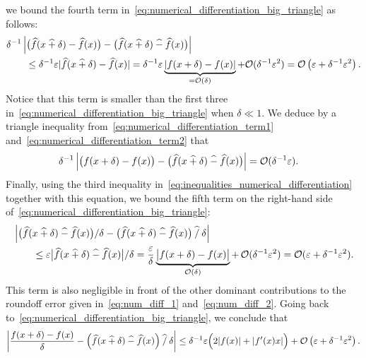 \begin{solution}
    we bound the fourth term in~\eqref{eq:numerical_differentiation_big_triangle} as follows:
    \begin{align}
        \nonumber
        &\delta^{-1} \left\lvert \bigl( \widehat f(x \mathbin{\widehat +} \delta) - \widehat f(x) \bigr)  - \bigl( \widehat f(x \mathbin{\widehat +} \delta) \mathbin{\widehat -} \widehat f(x) \bigr)  \right\rvert \\
        \label{eq:numerical_differentiation_term2}
        &\qquad \leq \delta^{-1} \varepsilon \lvert\widehat f(x \mathbin{\widehat +} \delta) - \widehat f(x)\rvert
        = \delta^{-1} \varepsilon  \underbrace{\lvert f(x + \delta) - f(x)\rvert}_{= \mathcal O(\delta)} +  \mathcal O (\delta^{-1} \varepsilon^2)
        = \mathcal O\left(\varepsilon + \delta^{-1} \varepsilon^2\right).
    \end{align}
    Notice that this term is smaller than the first three in~\eqref{eq:numerical_differentiation_big_triangle} when $\delta \ll 1$.
    We deduce by a triangle inequality from~\eqref{eq:numerical_differentiation_term1} and~\eqref{eq:numerical_differentiation_term2} that
    \begin{align*}
        \label{eq:intermedia_numerical_derivative}
        \delta^{-1} \left\lvert \bigl( f(x + \delta) - f(x) \bigr)
        - \bigl( \widehat f(x \mathbin{\widehat +} \delta) \mathbin{\widehat -} \widehat f(x) \bigr) \right\rvert
        &= \mathcal O(\delta^{-1} \varepsilon).
    \end{align*}
    Finally, using the third inequality in~\eqref{eq:inequalities_numerical_differentiation} together with this equation,
    we bound the fifth term on the right-hand side of~\eqref{eq:numerical_differentiation_big_triangle}:
    \begin{align*}
        &\left\lvert \bigl( \widehat f(x \mathbin{\widehat +} \delta) \mathbin{\widehat -} \widehat f(x) \bigr) / \delta
        - \bigl( \widehat f(x \mathbin{\widehat +} \delta) \mathbin{\widehat -} \widehat f(x) \bigr) \mathbin{\widehat /} \delta \right\rvert \\
        &\qquad \leq \varepsilon \bigl\lvert  \widehat f(x \mathbin{\widehat +} \delta) \mathbin{\widehat -} \widehat f(x) \bigr \rvert / \delta
        = \frac{\varepsilon}{\delta} \underbrace{ \bigl\lvert  f(x + \delta) - f(x) \bigr \rvert }_{\mathcal O(\delta)}
        +\, \mathcal O(\delta^{-1} \varepsilon^2)
        = \mathcal O(\varepsilon + \delta^{-1} \varepsilon^2).
    \end{align*}
    This term is also negligible in front of the other dominant contributions to the roundoff error given in~\eqref{eq:num_diff_1} and~\eqref{eq:num_diff_2}.
    Going back to~\eqref{eq:numerical_differentiation_big_triangle},
    we conclude that
    \[
        \left\lvert \frac{f(x + \delta) - f(x)}{\delta} - \Bigl(\widehat f(x \mathbin{\widehat +} \delta) \mathbin{\widehat -} \widehat f(x)\Bigr) \mathbin{\widehat /} \delta \right\rvert
        \leq \delta^{-1} \varepsilon \Bigl( 2 \lvert f(x) \rvert + \lvert f'(x)x \rvert \Bigr) + \mathcal O\left(\varepsilon + \delta^{-1} \varepsilon^2\right).
    \]

\end{solution}
